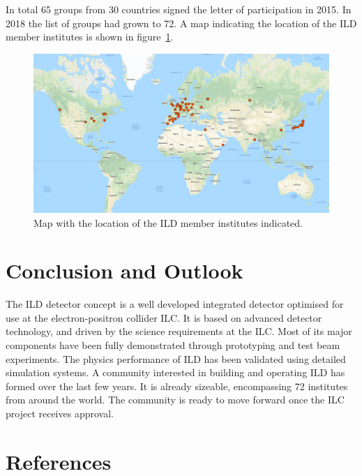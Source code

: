 \documentclass[%
 amsmath,amssymb,
 aps,
 longbibliography,
]{revtex4-1}
\begin{document}
In total 65 groups from 30 countries signed the letter of participation in 2015. In 2018 the list of groups had grown to 72. A map indicating the location of the ILD member institutes is shown in figure~\ref{ild-fig-membermap}.

\begin{figure}
    \centering
    \includegraphics[width=0.9\hsize]{figures/ILD_members_map.pdf}
    \caption{Map with the location of the ILD member institutes indicated.}
    \label{ild-fig-membermap}
\end{figure}



\section{Conclusion and Outlook}
The ILD detector concept is a well developed integrated detector optimised for use at the electron-positron collider ILC. It is based on advanced detector technology, and driven by the science requirements at the ILC. Most of its major components have been fully demonstrated through prototyping and test beam experiments. The physics performance of ILD has been validated using detailed simulation systems. A community interested in building and operating ILD has formed over the last few years. It is already sizeable, encompassing 72 institutes from around the world. The community is ready to move forward once the ILC project receives approval. 

\section{References}


\end{document}
